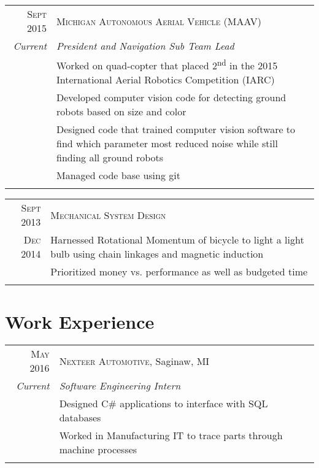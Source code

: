 \documentclass[a4paper,10pt]{article} %
\begin{document}
\begin{tabular}{r|p{13cm}}
\textsc{Sept 2015} & \textsc{Michigan Autonomous Aerial Vehicle (MAAV)} \\
\emph{Current} & \emph{President and Navigation Sub Team Lead} \\
& \footnotesize{Worked on quad-copter that placed 2\textsuperscript{nd} in the
  2015 International Aerial Robotics Competition (IARC)} \\
& \footnotesize{Developed computer vision code for detecting ground robots based
  on size and color} \\
& \footnotesize{Designed code that trained computer vision software to find
  which parameter most reduced noise while still finding all ground robots} \\
& \footnotesize{Managed code base using git} \\
\multicolumn{2}{c}{} \\
\end{tabular}


\begin{tabular}{r|p{13cm}}
\textsc{Sept 2013} & \textsc{Mechanical System Design} \\
\textsc{Dec 2014} & \footnotesize{Harnessed Rotational Momentum of bicycle to
  light a light bulb using chain linkages and magnetic induction} \\
& \footnotesize{Prioritized money vs. performance as well as budgeted time} \\
\multicolumn{2}{c}{} \\
\end{tabular}


\section{Work Experience}

\begin{tabular}{r|p{13cm}}
\textsc{May 2016} & \textsc{Nexteer Automotive}, Saginaw, MI \\
\emph{Current} & \emph{Software Engineering Intern} \\
& \footnotesize{Designed C\# applications to interface with SQL databases} \\
& \footnotesize{Worked in Manufacturing IT to trace parts through machine processes} \\
\multicolumn{2}{c}{} \\
\end{tabular}
\end{document}
